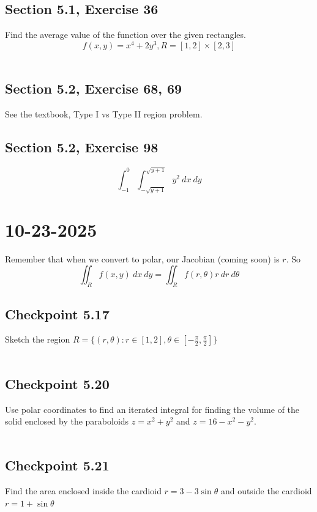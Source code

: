 \documentclass[]{mangos-musings}
\begin{document}
\subsection{Section 5.1, Exercise 36}
Find the average value of the function over the given rectangles.
\[f(x, y) = x^4 + 2y^3, R = [1,2]\times [2, 3]\]
\begin{align*}
  \\ \\
\end{align*}
%
%
%
%
\subsection{Section 5.2, Exercise 68, 69}
See the textbook, Type I vs Type II region problem.

\subsection{Section 5.2, Exercise 98}
\[\int_{-1}^{0}\int_{-\sqrt{y + 1}}^{\sqrt{y + 1}}y^2 \ dx \ dy \]


\newpage
\section{10-23-2025}
Remember that when we convert to polar, our Jacobian (coming soon) is $r$. So 
\[\iint_{R}f(x, y)\ dx \ dy = \iint_R f(r,\theta) r \ dr \ d\theta\]

\subsection{Checkpoint 5.17}
Sketch the region $R=\{(r,\theta) : r\in[1,2], \theta\in\left[-\frac{\pi}{2},\frac{\pi}{2}\right]\}$
\begin{align*}
  \\ \\
\end{align*}
%
%
%
%
\subsection{Checkpoint 5.20}
Use polar coordinates to find an iterated integral for finding the volume of the solid enclosed by the paraboloids $z = x^2 + y^2$ and $z = 16 - x^2 - y^2$.
\begin{align*}
  \\ \\
\end{align*}
%
%
%
%
\subsection{Checkpoint 5.21}
Find the area enclosed inside the cardioid $r = 3 - 3\sin \theta$ and outside the cardioid $r = 1 + \sin \theta$
\begin{align*}
  \\ \\
\end{align*}
%
%
%
%
\end{document}
